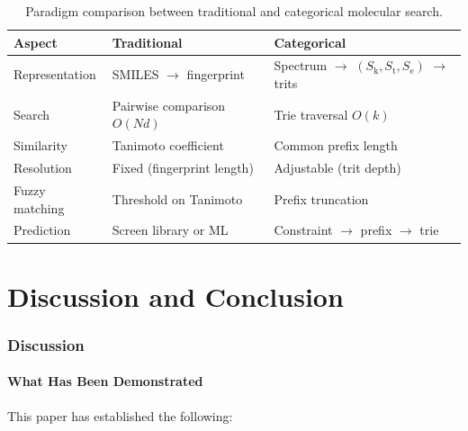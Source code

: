 \documentclass[11pt,a4paper]{article}
\theoremstyle{definition}
\theoremstyle{remark}
\newcommand{\Sk}{S_{\mathrm{k}}}
\newcommand{\St}{S_{\mathrm{t}}}
\newcommand{\Se}{S_{\mathrm{e}}}
\begin{document}
\begin{table}[H]
\centering
\caption{Paradigm comparison between traditional and categorical molecular search.}
\label{tab:paradigm}
\begin{tabular}{lll}
\toprule
Aspect & Traditional & Categorical \\
\midrule
Representation & SMILES $\to$ fingerprint & Spectrum $\to$ $(\Sk, \St, \Se)$ $\to$ trits \\
Search & Pairwise comparison $O(Nd)$ & Trie traversal $O(k)$ \\
Similarity & Tanimoto coefficient & Common prefix length \\
Resolution & Fixed (fingerprint length) & Adjustable (trit depth) \\
Fuzzy matching & Threshold on Tanimoto & Prefix truncation \\
Prediction & Screen library or ML & Constraint $\to$ prefix $\to$ trie \\
\bottomrule
\end{tabular}
\end{table}


\part{Discussion and Conclusion}

\section{Discussion}
\label{sec:discussion}

\subsection{What Has Been Demonstrated}

This paper has established the following:
\end{document}
